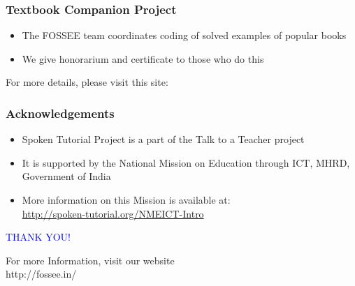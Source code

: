 \documentclass[17pt]{beamer}
\begin{document}
\begin{frame}
	\frametitle{Textbook Companion Project}
	\begin{itemize}
		\item The FOSSEE team coordinates coding of solved examples of popular
		books 
		\item We give honorarium and certificate to those who do this
	\end{itemize}
	For more details, please visit this site:
	\begin{center}
		{\color{blue}{http://tbc-python.fossee.in/}}
	\end{center}
\end{frame}
\begin{frame}
	\frametitle{Acknowledgements}
	\begin{itemize}
		\item Spoken Tutorial Project is a part of the Talk to a Teacher  project 
		\item It is supported by the National Mission on Education through  ICT, MHRD, Government of India 
		\item More information on this Mission is available at: \\{\color{blue}\url{http://spoken-tutorial.org/NMEICT-Intro}}
	\end{itemize}
\end{frame}
\begin{frame}
	
	\begin{block}{}
		\begin{center}
			\textcolor{blue}{\Large THANK YOU!} 
		\end{center}
	\end{block}
	\begin{block}{}
		\begin{center}
			For more Information, visit our website\\
			{http://fossee.in/}
		\end{center}  
	\end{block}
\end{frame}
\end{document}
